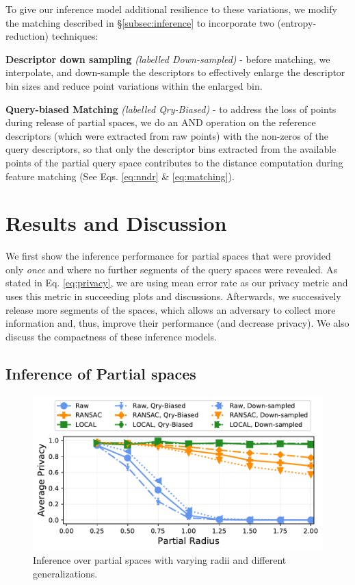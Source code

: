 To give our inference model additional resilience to these variations, we modify the matching described in \S\ref{subsec:inference} to incorporate two (entropy-reduction) techniques:

\textbf{Descriptor down sampling} \emph{(labelled Down-sampled)} - before matching, we interpolate, and down-sample the descriptors to effectively enlarge the descriptor bin sizes and reduce point variations within the enlarged bin.


\textbf{Query-biased Matching} \emph{(labelled Qry-Biased)} - to address the loss of points during release of partial spaces, we do an AND operation on the reference descriptors (which were extracted from raw points) with the non-zeros of the query descriptors, so that only the descriptor bins extracted from the available points of the partial query space contributes to the distance computation during feature matching (See Eqs. \ref{eq:nndr} \& \ref{eq:matching}).

\section{Results and Discussion}\label{sec:discussion}
We first show the inference performance for partial spaces that were provided only \textit{once} and where no further segments of the query spaces were revealed. As stated in Eq. \ref{eq:privacy}, we are using mean error rate as our privacy metric and uses this metric in succeeding plots and discussions. Afterwards, we successively release more segments of the spaces, which allows an adversary to collect more information and, thus, improve their performance (and decrease privacy). We also discuss the compactness of these inference models. %

\subsection{Inference of Partial spaces}\label{subsec:inference-partials}

\begin{figure}[t]
	\centering
	\vspace{-2mm}
	\includegraphics[width=\columnwidth]{figures/plots/partials-more-rotations}
	\caption{Inference over partial spaces with varying radii and different generalizations.}
	\label{fig:partial-all}
\end{figure}

